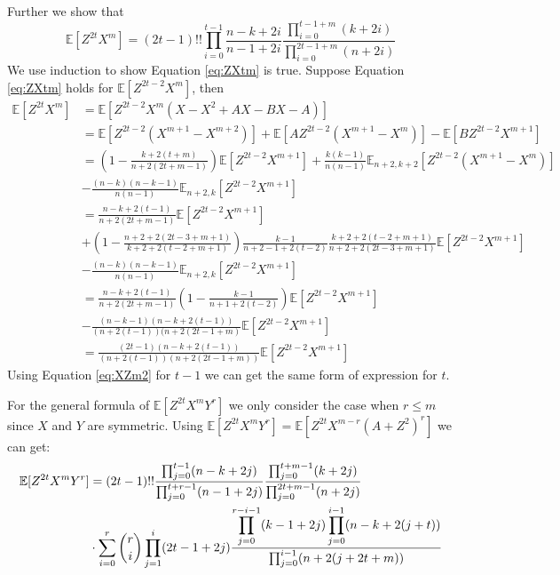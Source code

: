 \documentclass{article}
\def\E{\mathbb{E}}
\begin{document}
Further we show that
\begin{equation}\label{eq:ZXtm}
\E[Z^{2t} X^m] = (2t-1)!! \prod_{i=0}^{t-1}\frac{n-k+2i}{n-1+2i}
\frac{\prod_{i=0}^{t-1+m} (k+2i)}{\prod_{i=0}^{2t-1+m}(n+2i)}
\end{equation}
We use induction to show Equation \eqref{eq:ZXtm} is true.
Suppose Equation \eqref{eq:ZXtm} holds for $\E[Z^{2t-2}X^m]$, then
\begin{align*}
\E[Z^{2t}X^m] &= \E[Z^{2t-2}X^m(X-X^2+AX-BX-A)] \\
&= \E[Z^{2t-2}(X^{m+1} - X^{m+2})] +
\E[A Z^{2t-2} (X^{m+1} - X^m)] - \E[BZ^{2t-2} X^{m+1}] \\
&= \left(1-\frac{k+2(t+m)}{n+2(2t+m-1)}\right)\E[Z^{2t-2}X^{m+1}] +
\frac{k(k-1)}{n(n-1)}\E_{n+2,k+2}[Z^{2t-2}(X^{m+1} - X^m)] \\
&-\frac{(n-k)(n-k-1)}{n(n-1)}\E_{n+2,k}[Z^{2t-2}X^{m+1}]\\
&=\frac{n-k+2(t-1)}{n+2(2t+m-1)}\E[Z^{2t-2}X^{m+1}] \\
&+
\left(1-\frac{n+2+2(2t-3+m+1)}{k+2+2(t-2+m+1)}\right)
\frac{k-1}{n+2-1+2(t-2)}\frac{k+2+2(t-2+m+1)}{n+2+2(2t-3+m+1)}\E[Z^{2t-2}X^{m+1}] \\
&-\frac{(n-k)(n-k-1)}{n(n-1)}\E_{n+2,k}[Z^{2t-2}X^{m+1}]\\
&=\frac{n-k+2(t-1)}{n+2(2t+m-1)}
\left(1-\frac{k-1}{n+1+2(t-2)}\right)\E[Z^{2t-2}X^{m+1}] \\
&-\frac{(n-k-1)(n-k+2(t-1))}{(n+2(t-1))(n+2(2t-1+m)}\E[Z^{2t-2}X^{m+1}] \\
&=\frac{(2t-1)(n-k+2(t-1))}{(n+2(t-1)) (n+2(2t-1+m))}\E[Z^{2t-2}X^{m+1}]
\end{align*}
Using Equation \eqref{eq:XZm2} for $t-1$
we can get the same form of expression for $t$.

For the general formula of $\E[Z^{2t}X^m Y^r]$
we only consider the case when $r\leq m$ since $X$ and $Y$ are symmetric.
Using $\E[Z^{2t}X^m Y^r]=\E[Z^{2t}X^{m-r}(A+Z^2)^r]$ we can get:
\begin{align}
\E[Z^{2t}X^m Y^r] &= (2t-1)!!
\frac{\prod_{j=0}^{t-1} (n-k+2j)}{\prod_{j=0}^{t+r-1} (n-1+2j)}
\frac{\prod_{j=0}^{t+m-1}(k+2j)}{\prod_{j=0}^{2t+m-1} (n+2j)}\notag\\
&\cdot\sum_{i=0}^r\binom{r}{i}\prod_{j=1}^i (2t-1+2j)
\frac{\displaystyle\prod_{j=0}^{r-i-1}(k-1+2j)
\prod_{j=0}^{i-1}(n-k+2(j+t))}{\prod_{j=0}^{i-1}(n+2(j+2t+m))}
\end{align}


\end{document}
